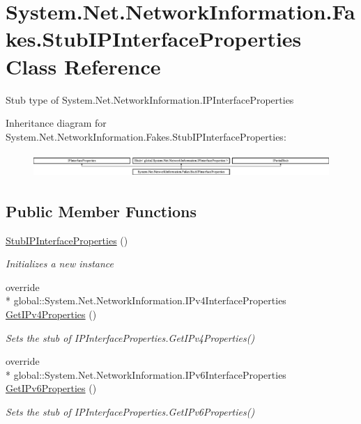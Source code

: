 \hypertarget{class_system_1_1_net_1_1_network_information_1_1_fakes_1_1_stub_i_p_interface_properties}{\section{System.\-Net.\-Network\-Information.\-Fakes.\-Stub\-I\-P\-Interface\-Properties Class Reference}
\label{class_system_1_1_net_1_1_network_information_1_1_fakes_1_1_stub_i_p_interface_properties}
}


Stub type of System.\-Net.\-Network\-Information.\-I\-P\-Interface\-Properties 


Inheritance diagram for System.\-Net.\-Network\-Information.\-Fakes.\-Stub\-I\-P\-Interface\-Properties\-:\begin{figure}[H]
\begin{center}
\leavevmode
\includegraphics[height=0.915033cm]{class_system_1_1_net_1_1_network_information_1_1_fakes_1_1_stub_i_p_interface_properties}
\end{center}
\end{figure}
\subsection*{Public Member Functions}
\begin{DoxyCompactItemize}
\item 
\hyperlink{class_system_1_1_net_1_1_network_information_1_1_fakes_1_1_stub_i_p_interface_properties_a39cbdd71f228db8121037f673572d514}{Stub\-I\-P\-Interface\-Properties} ()
\begin{DoxyCompactList}\small\item\em Initializes a new instance\end{DoxyCompactList}\item 
override \\*
global\-::\-System.\-Net.\-Network\-Information.\-I\-Pv4\-Interface\-Properties \hyperlink{class_system_1_1_net_1_1_network_information_1_1_fakes_1_1_stub_i_p_interface_properties_aaed60270b531ef587c5ceb5dac1243e9}{Get\-I\-Pv4\-Properties} ()
\begin{DoxyCompactList}\small\item\em Sets the stub of I\-P\-Interface\-Properties.\-Get\-I\-Pv4\-Properties()\end{DoxyCompactList}\item 
override \\*
global\-::\-System.\-Net.\-Network\-Information.\-I\-Pv6\-Interface\-Properties \hyperlink{class_system_1_1_net_1_1_network_information_1_1_fakes_1_1_stub_i_p_interface_properties_a110f36795032defc1195564397a39391}{Get\-I\-Pv6\-Properties} ()
\begin{DoxyCompactList}\small\item\em Sets the stub of I\-P\-Interface\-Properties.\-Get\-I\-Pv6\-Properties()\end{DoxyCompactList}\end{DoxyCompactItemize}
